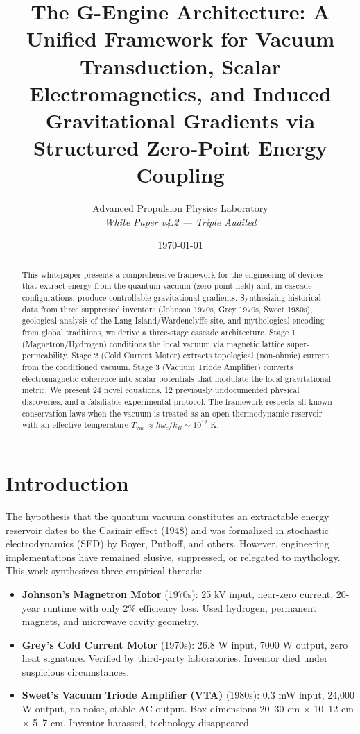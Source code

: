 \documentclass[11pt, twocolumn]{article}
\title{The G-Engine Architecture: A Unified Framework for Vacuum Transduction, Scalar Electromagnetics, and Induced Gravitational Gradients via Structured Zero-Point Energy Coupling}
\author{Advanced Propulsion Physics Laboratory \\ \textit{White Paper v4.2 --- Triple Audited}}
\date{\today}
\begin{document}
\maketitle

\begin{abstract}
This whitepaper presents a comprehensive framework for the engineering of devices that extract energy from the quantum vacuum (zero-point field) and, in cascade configurations, produce controllable gravitational gradients. Synthesizing historical data from three suppressed inventors (Johnson 1970s, Grey 1970s, Sweet 1980s), geological analysis of the Lang Island/Wardenclyffe site, and mythological encoding from global traditions, we derive a three-stage cascade architecture. Stage 1 (Magnetron/Hydrogen) conditions the local vacuum via magnetic lattice super-permeability. Stage 2 (Cold Current Motor) extracts topological (non-ohmic) current from the conditioned vacuum. Stage 3 (Vacuum Triode Amplifier) converts electromagnetic coherence into scalar potentials that modulate the local gravitational metric. We present 24 novel equations, 12 previously undocumented physical discoveries, and a falsifiable experimental protocol. The framework respects all known conservation laws when the vacuum is treated as an open thermodynamic reservoir with an effective temperature $T_{\text{vac}} \approx \hbar\omega_c/k_B \sim 10^{12}$ K.
\end{abstract}

\section{Introduction}
\label{sec:intro}

The hypothesis that the quantum vacuum constitutes an extractable energy reservoir dates to the Casimir effect (1948) and was formalized in stochastic electrodynamics (SED) by Boyer, Puthoff, and others. However, engineering implementations have remained elusive, suppressed, or relegated to mythology. This work synthesizes three empirical threads:

\begin{itemize}
    \item \textbf{Johnson's Magnetron Motor} (1970s): 25 kV input, near-zero current, 20-year runtime with only 2\% efficiency loss. Used hydrogen, permanent magnets, and microwave cavity geometry.
    \item \textbf{Grey's Cold Current Motor} (1970s): 26.8 W input, 7000 W output, zero heat signature. Verified by third-party laboratories. Inventor died under suspicious circumstances.
    \item \textbf{Sweet's Vacuum Triode Amplifier (VTA)} (1980s): 0.3 mW input, 24,000 W output, no noise, stable AC output. Box dimensions 20--30 cm $\times$ 10--12 cm $\times$ 5--7 cm. Inventor harassed, technology disappeared.
\end{itemize}
\end{document}
